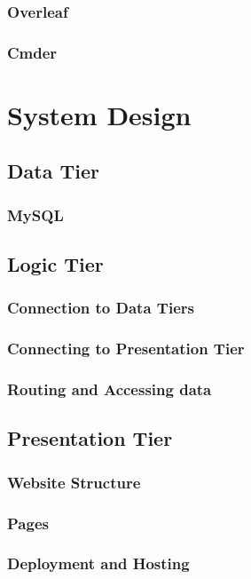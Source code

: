 \subsection{Overleaf}
\subsection{Cmder}

\chapter{System Design}

\section{Data Tier}
\subsection{MySQL}

\section{Logic Tier}
\subsection{Connection to Data Tiers}
\subsection{Connecting to Presentation Tier}
\subsection{Routing and Accessing data}


\section{Presentation Tier}
\subsection{Website Structure}
\subsection{Pages}
\subsection{Deployment and Hosting}

